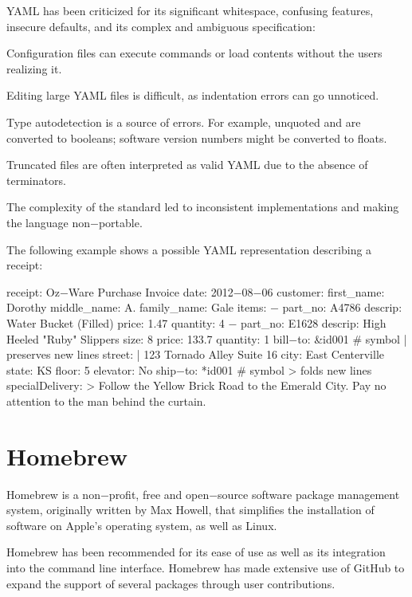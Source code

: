 YAML has been criticized for its significant whitespace, confusing features, insecure defaults, and its complex and
ambiguous specification:
\bit
\item Configuration files can execute commands or load contents without the users realizing it.
\item Editing large YAML files is difficult, as indentation errors can go unnoticed.
\item Type autodetection is a source of errors. For example, unquoted  and  are converted to
booleans; software version numbers might be converted to floats.
\item Truncated files are often interpreted as valid YAML due to the absence of terminators.
\item The complexity of the standard led to inconsistent implementations and making the language non$-$portable.
\eit

The following example shows a possible YAML representation describing a receipt:

\begin{block}
receipt: Oz$-$Ware Purchase Invoice
date: 2012$-$08$-$06
customer:
    first_name: Dorothy
    middle_name: A.
    family_name: Gale
items:
    $-$ part_no: A4786
      descrip: Water Bucket (Filled)
      price: 1.47
      quantity: 4
    $-$ part_no: E1628
      descrip: High Heeled "Ruby" Slippers
      size: 8
      price: 133.7
      quantity: 1
bill$-$to:  &id001
    # symbol | preserves new lines
    street: |
            123 Tornado Alley
            Suite 16
    city: East Centerville
    state: KS
    floor: 5
    elevator: No
ship$-$to:  *id001
# symbol > folds new lines
specialDelivery:  >
    Follow the Yellow Brick
    Road to the Emerald City.
    Pay no attention to the
    man behind the curtain.
\end{block}

\section{Homebrew}


\bd[Homebrew]
Homebrew is a non$-$profit, free and open$-$source software package management system, originally written by Max Howell,
that simplifies the installation of software on Apple's operating system, as well as Linux.
\ed

Homebrew has been
recommended for its ease of use as well as its integration into the command line interface. Homebrew has made extensive
use of GitHub to expand the support of several packages through user contributions.

